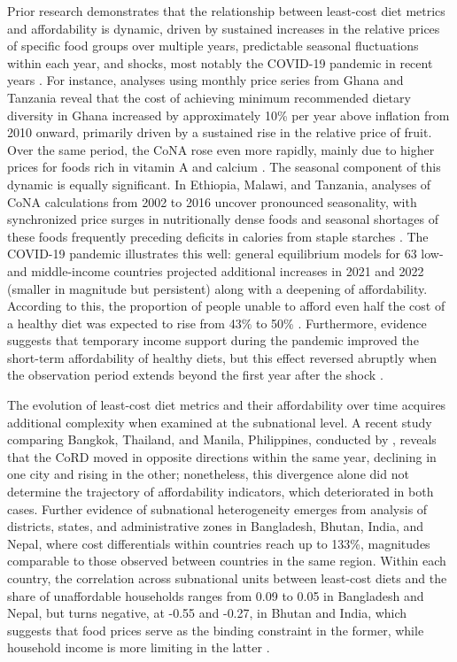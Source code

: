 \documentclass[Afour, sageh,times]{sagej}
\begin{document}
Prior research demonstrates that the relationship between least-cost diet metrics and affordability is dynamic, driven by sustained increases in the relative prices of specific food groups over multiple years, predictable seasonal fluctuations within each year, and shocks, most notably the COVID-19 pandemic in recent years \citep{Laborde2021, Mwambi2023, Lewis2023}. For instance, analyses using monthly price series from Ghana and Tanzania reveal that the cost of achieving minimum recommended dietary diversity in Ghana increased by approximately 10\% per year above inflation from 2010 onward, primarily driven by a sustained rise in the relative price of fruit. Over the same period, the CoNA rose even more rapidly, mainly due to higher prices for foods rich in vitamin A and calcium \citep{Masters2018}. The seasonal component of this dynamic is equally significant. In Ethiopia, Malawi, and Tanzania, analyses of CoNA calculations from 2002 to 2016 uncover pronounced seasonality, with synchronized price surges in nutritionally dense foods and seasonal shortages of these foods frequently preceding deficits in calories from staple starches \citep{Bai2020}. The COVID-19 pandemic illustrates this well: general equilibrium models for 63 low- and middle-income countries projected additional increases in 2021 and 2022 (smaller in magnitude but persistent) along with a deepening of affordability. According to this, the proportion of people unable to afford even half the cost of a healthy diet was expected to rise from 43\% to 50\% \citep{Laborde2021}. Furthermore, evidence suggests that temporary income support during the pandemic improved the short-term affordability of healthy diets, but this effect reversed abruptly when the observation period extends beyond the first year after the shock \citep{Lee2021, Lewis2023}.
\smallskip

The evolution of least-cost diet metrics and their affordability over time acquires additional complexity when examined at the subnational level. A recent study comparing Bangkok, Thailand, and Manila, Philippines, conducted by \citet{Mwambi2023}, reveals that the CoRD moved in opposite directions within the same year, declining in one city and rising in the other; nonetheless, this divergence alone did not determine the trajectory of affordability indicators, which deteriorated in both cases. Further evidence of subnational heterogeneity emerges from analysis of districts, states, and administrative zones in Bangladesh, Bhutan, India, and Nepal, where cost differentials within countries reach up to 133\%, magnitudes comparable to those observed between countries in the same region. Within each country, the correlation across subnational units between least-cost diets and the share of unaffordable households ranges from 0.09 to 0.05 in Bangladesh and Nepal, but turns negative, at -0.55 and -0.27, in Bhutan and India, which suggests that food prices serve as the binding constraint in the former, while household income is more limiting in the latter \citep{Dizon2021}.
\end{document}
